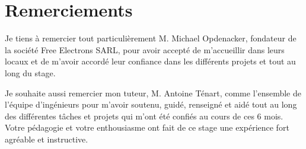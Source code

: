 \chapter*{Remerciements}
Je tiens à remercier tout particulièrement M. Michael Opdenacker, fondateur de la société Free Electrons SARL, pour avoir accepté de m'accueillir dans leurs locaux et de m'avoir accordé leur confiance dans les différents projets et tout au long du stage.
\par
Je souhaite aussi remercier mon tuteur, M. Antoine Ténart, comme l'ensemble de l'équipe d'ingénieurs pour m'avoir soutenu, guidé, renseigné et aidé tout au long des différentes tâches et projets qui m'ont été confiés au cours de ces 6 mois. Votre pédagogie et votre enthousiasme ont fait de ce stage une expérience fort agréable et instructive.
